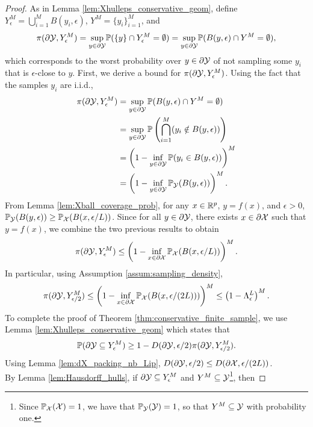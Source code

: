\documentclass[12pt]{l4dc2022} %
\begin{document}
\begin{proof}%
As in Lemma \ref{lem:Xhulleps_conservative_geom}, define $Y_\epsilon^M
	=
	\bigcup_{i=1}^M B(y_i,\epsilon)$, 
	$Y^M=\{y_i\}_{i=1}^M$, and 
$$
\pi(\partial\mathcal{Y},Y_\epsilon^M)
=
\underset{y\in\partial\mathcal{Y}}{\sup}\mathbb{P}(\{y\} \cap Y_\epsilon^M = \emptyset)
=
\underset{y\in\partial\mathcal{Y}}{\sup}\mathbb{P}(B(y,\epsilon) \cap Y^M = \emptyset),
$$
which corresponds to the worst probability over $y\in\partial\mathcal{Y}$ of not sampling some $y_i$ that is $\epsilon$-close to $y$. 
% 
First, we derive a bound for $\pi(\partial\mathcal{Y},Y_\epsilon^M)$. 
% 
Using the fact that the samples $y_i$ are i.i.d., 
\begin{align*}
\pi(\partial\Y,Y_\epsilon^M) 
&=
\sup_{y\in\partial\Y}\Prob(B(y,\epsilon) \cap Y^M = \emptyset)
\\
&= \sup_{y\in\partial\Y}\Prob\left(\bigcap_{i=1}^M
(y_i\notin B(y,\epsilon))\right)
\\
&= \left(1 -
	\inf_{y\in\partial\Y}\Prob(y_i\in B(y,\epsilon)) 
\right)^M
% 
% 
% 
% 
\\
&=\left(1 -
	\inf_{y\in\partial\Y}\Prob_\Y(B(y,\epsilon)) 
\right)^M.
\end{align*}
From Lemma \ref{lem:Xball_coverage_prob}, 
for any $x\in\mathbb{R}^p$, 
$y=f(x)$, and 
$\epsilon>0$, 
$\mathbb{P}_{\mathcal{Y}}(B(y,\epsilon))
\geq \mathbb{P}_{\mathcal{X}}(B(x,\epsilon/L))$. 
Since for all $y\in\partial\mathcal{Y}$, there exists $x\in\partial\mathcal{X}$ such that $y=f(x)$, we combine the two previous results to obtain 
\begin{align*}
\pi(\partial\mathcal{Y},Y_\epsilon^M) 
\leq 
\left(1 -
	\inf_{x\in\partial\mathcal{X}}\mathbb{P}_{\mathcal{X}}(B(x,\epsilon/L))
\right)^M.
\end{align*}
In particular, using Assumption \ref{assum:sampling_density}, 
\begin{align*}
\pi(\partial\mathcal{Y},Y_{\epsilon/2}^M) 
\leq 
\left(1 -
	\inf_{x\in\partial\mathcal{X}}\mathbb{P}_{\mathcal{X}}(B(x,\epsilon/(2L)))
\right)^M
\leq 
\left(1 -
	\Lambda_{\epsilon}^{L}
\right)^M.
\end{align*}
% 
To complete the proof of Theorem \ref{thm:conservative_finite_sample}, we use Lemma \ref{lem:Xhulleps_conservative_geom} which states that 
$$
\mathbb{P}(\partial\mathcal{Y}\subseteq Y_\epsilon^M) \geq 1 - D(\partial\mathcal{Y},\epsilon/2)
\pi(\partial\mathcal{Y},Y_{\epsilon/2}^M)
.
$$
% 
% 
Using Lemma \ref{lem:dX_packing_nb_Lip},  
$D(\partial\mathcal{Y},\epsilon/2)\leq D(\partial\mathcal{X},\epsilon/(2L))$. 
% 
\\
By Lemma \ref{lem:Hausdorff_hulls}, 
 if $\partial\mathcal{Y}\subseteq Y_\epsilon^M$
and $Y^M\subseteq\mathcal{Y}$\footnote{Since $\mathbb{P}_{\mathcal{X}}(\mathcal{X})=1$, we have that $\mathbb{P}_{\mathcal{Y}}(\mathcal{Y})=1$, so that $Y^M\subseteq\mathcal{Y}$ with probability one.}, then 

\end{proof}
\end{document}
